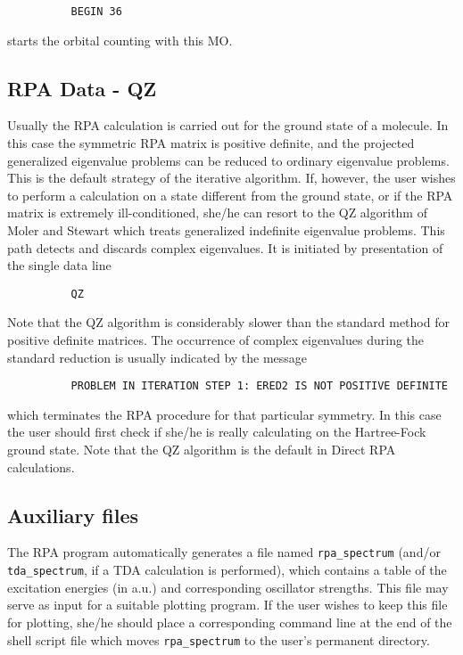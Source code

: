 \documentclass[11pt,fleqn]{article}
\begin{document}
{
\footnotesize
\begin{verbatim}
          BEGIN 36
\end{verbatim}
}
starts the orbital counting with this MO.
%
\subsection{RPA Data - QZ}
Usually the RPA calculation is carried out for the ground state of a molecule.
In this case the symmetric RPA matrix is positive definite, and the projected
generalized eigenvalue problems can be reduced to ordinary eigenvalue
problems. This is the default strategy of the iterative algorithm.
If, however, the user wishes to perform a calculation on a state different
from the ground state, or if the RPA matrix is extremely ill-conditioned,
she/he can resort to the QZ algorithm of Moler and Stewart which treats
generalized indefinite eigenvalue problems. This path detects and discards
complex eigenvalues. It is initiated by presentation of the single data line

{
\footnotesize
\begin{verbatim}
          QZ
\end{verbatim}
}
Note that the QZ algorithm is considerably slower than the standard method
for positive definite matrices.
The occurrence of complex eigenvalues during the standard reduction is usually
indicated by the message

{
\footnotesize
\begin{verbatim}
          PROBLEM IN ITERATION STEP 1: ERED2 IS NOT POSITIVE DEFINITE
\end{verbatim}
}
which terminates the RPA procedure for that particular symmetry. In this
case the user should first check if she/he is really calculating on the
Hartree-Fock ground state.
Note that the QZ algorithm is the default in Direct RPA calculations.
%
\subsection{Auxiliary files}
The RPA program automatically generates a file named {\tt rpa\_spectrum}
(and/or {\tt tda\_spectrum}, if a TDA calculation is performed),
which contains a table of the excitation energies (in a.u.) and
corresponding oscillator strengths. This file may serve as input for
a suitable plotting program.
If the user wishes to keep this
file for plotting, she/he should place a corresponding command line
at the end of the shell script file which moves {\tt rpa\_spectrum} to the user's
permanent directory.
\end{document}
